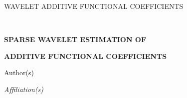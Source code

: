 \documentclass[12pt]{article} %
\theoremstyle{definition}
\theoremstyle{plain}
\begin{document}
\renewcommand{\baselinestretch}{2}


{\hfill {\footnotesize\rm WAVELET ADDITIVE FUNCTIONAL COEFFICIENTS} \hfill}

\renewcommand{\thefootnote}{}
$\ $\par


\fontsize{12}{14pt plus.8pt minus .6pt}\selectfont \vspace{0.8pc}
\centerline{\large\bf SPARSE WAVELET ESTIMATION OF}
\vspace{2pt}
\centerline{\large\bf ADDITIVE FUNCTIONAL COEFFICIENTS}
\vspace{.4cm}
\centerline{Author(s)}
\vspace{.4cm}
\centerline{\it Affiliation(s)}
\vspace{.55cm} \fontsize{9}{11.5pt plus.8pt minus.6pt}\selectfont

\end{document}

